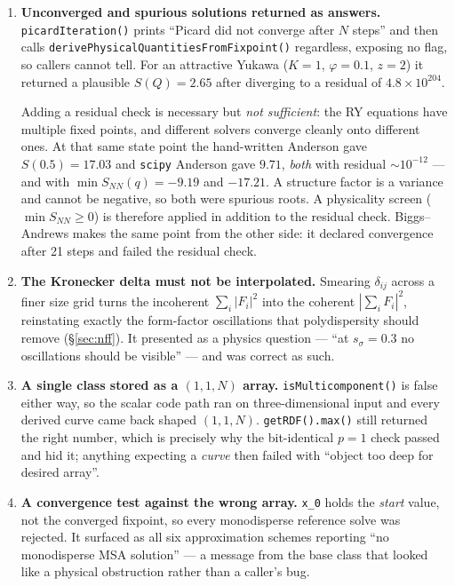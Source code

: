 \documentclass[11pt,a4paper]{article}
\newcommand{\code}[1]{\texttt{#1}}
\begin{document}
\begin{enumerate}
\item \textbf{Unconverged and spurious solutions returned as answers.}
\code{picardIteration()} prints ``Picard did not converge after $N$ steps''
and then calls \code{derivePhysicalQuantitiesFromFixpoint()} regardless,
exposing no flag, so callers cannot tell. For an attractive Yukawa
($K=1$, $\varphi=0.1$, $z=2$) it returned a plausible $S(Q)=2.65$ after
diverging to a residual of $4.8\times10^{204}$.

Adding a residual check is necessary but \emph{not sufficient}: the RY
equations have multiple fixed points, and different solvers converge cleanly
onto different ones. At that same state point the hand-written Anderson gave
$S(0.5)=17.03$ and \code{scipy} Anderson gave $9.71$, \emph{both} with
residual ${\sim}10^{-12}$ --- and with $\min S_{NN}(q) = -9.19$ and $-17.21$.
A structure factor is a variance and cannot be negative, so both were
spurious roots. A physicality screen ($\min S_{NN} \ge 0$) is therefore
applied in addition to the residual check. Biggs--Andrews makes the same
point from the other side: it declared convergence after 21 steps and failed
the residual check.


\item \textbf{The Kronecker delta must not be interpolated.} Smearing
$\delta_{ij}$ across a finer size grid turns the incoherent $\sum_i|F_i|^2$
into the coherent $|\sum_i F_i|^2$, reinstating exactly the form-factor
oscillations that polydispersity should remove
(\S\ref{sec:nff}). It presented as a physics question --- ``at
$s_\sigma=0.3$ no oscillations should be visible'' --- and was correct as
such.

\item \textbf{A single class stored as a $(1,1,N)$ array.}
\code{isMulticomponent()} is false either way, so the scalar code path ran on
three-dimensional input and every derived curve came back shaped $(1,1,N)$.
\code{getRDF().max()} still returned the right number, which is precisely why
the bit-identical $p=1$ check passed and hid it; anything expecting a
\emph{curve} then failed with ``object too deep for desired array''.

\item \textbf{A convergence test against the wrong array.} \code{x\_0} holds
the \emph{start} value, not the converged fixpoint, so every monodisperse
reference solve was rejected. It surfaced as all six approximation schemes
reporting ``no monodisperse MSA solution'' --- a message from the base class
that looked like a physical obstruction rather than a caller's bug.


\end{enumerate}
\end{document}
